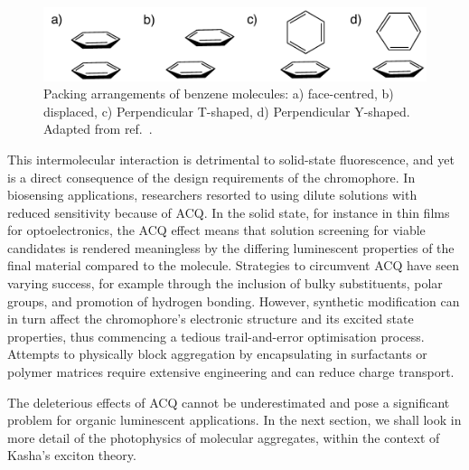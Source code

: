 \begin{figure}[t]
\centering
  \includegraphics[width=0.7\linewidth]{1Intro/Stacking.pdf}
  \caption[Stacking arrangements of benzene]{Packing arrangements of benzene molecules: a) face-centred, b) displaced, c) Perpendicular T-shaped, d) Perpendicular Y-shaped. Adapted from ref.~.}
  \label{figure: Benzene_Stacking}
\end{figure}

This intermolecular interaction is detrimental to solid-state fluorescence, and yet is a direct consequence of the design requirements of the chromophore. In biosensing applications, researchers resorted to using dilute solutions with reduced sensitivity because of \ac{ACQ}.\cite{Thomas2007,Kwok2015} In the solid state, for instance in thin films for optoelectronics, the \ac{ACQ} effect means that solution screening for viable candidates is rendered meaningless by the differing luminescent properties of the final material compared to the molecule. Strategies to circumvent \ac{ACQ} have seen varying success, for example through the inclusion of bulky substituents, polar groups, and promotion of hydrogen bonding.\cite{Hong2009,Zhang2013,Mei2014,Mei2015} However, synthetic modification can in turn affect the chromophore's electronic structure and its excited state properties, thus commencing a tedious trail-and-error optimisation process. Attempts to physically block aggregation by encapsulating in surfactants or polymer matrices require extensive engineering and can reduce charge transport.\cite{Hong2009,Chen2000,Lee2013} 

The deleterious effects of \ac{ACQ} cannot be underestimated and pose a significant problem for organic luminescent applications. In the next section, we shall look in more detail of the photophysics of molecular aggregates, within the context of Kasha's exciton theory.
